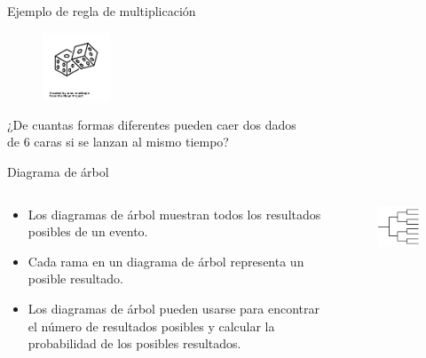 \documentclass{beamer}
\begin{document}
\begin{frame}{Ejemplo de regla de multiplicaci\'on}
  \transdissolve

  \begin{exampleblock}{}
    \begin{figure}
      \raggedleft
      \includegraphics[width=2cm,angle=0,trim={1mm 210mm 1mm 200mm},clip]{figures/dice-roll.png}
    \end{figure}

    {¿De cuantas formas diferentes pueden caer dos dados \\
    de 6 caras si se lanzan al mismo tiempo?}
  \end{exampleblock}

    \vfill
    \vfill
    \vfill
    \vfill
  
\end{frame}

\begin{frame}{Diagrama de árbol}
  \begin{columns}
      \begin{block}{}
        \begin{itemize}
           \item Los diagramas de árbol muestran todos los resultados posibles de un
          evento.
           \item Cada rama en un diagrama de árbol representa un posible resultado. 
           \item Los diagramas de árbol pueden usarse para encontrar el número de
          resultados posibles y calcular la probabilidad de los posibles resultados.
        \end{itemize}
      \end{block}

      \begin{figure}
        \centering
        \includegraphics[width=3cm]{figures/tree.png}
      \end{figure}
  \end{columns}
\end{frame}
\end{document}
